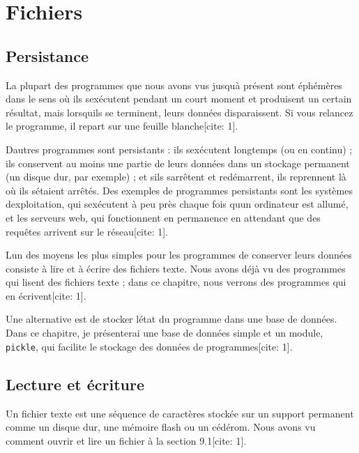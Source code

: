 \hypertarget{fichiers}{%
\section{Fichiers}\label{fichiers}}

\hypertarget{persistance}{%
\subsection{Persistance}\label{persistance}}

La plupart des programmes que nous avons vus jusqu\textquotesingle à
présent sont éphémères dans le sens où ils s\textquotesingle exécutent
pendant un court moment et produisent un certain résultat, mais
lorsqu\textquotesingle ils se terminent, leurs données disparaissent. Si
vous relancez le programme, il repart sur une feuille blanche{[}cite:
1{]}.

D\textquotesingle autres programmes sont persistants : ils
s\textquotesingle exécutent longtemps (ou en continu) ; ils conservent
au moins une partie de leurs données dans un stockage permanent (un
disque dur, par exemple) ; et s\textquotesingle ils
s\textquotesingle arrêtent et redémarrent, ils reprennent là où ils
s\textquotesingle étaient arrêtés. Des exemples de programmes
persistants sont les systèmes d\textquotesingle exploitation, qui
s\textquotesingle exécutent à peu près chaque fois qu\textquotesingle un
ordinateur est allumé, et les serveurs web, qui fonctionnent en
permanence en attendant que des requêtes arrivent sur le réseau{[}cite:
1{]}.

L\textquotesingle un des moyens les plus simples pour les programmes de
conserver leurs données consiste à lire et à écrire des fichiers texte.
Nous avons déjà vu des programmes qui lisent des fichiers texte ; dans
ce chapitre, nous verrons des programmes qui en écrivent{[}cite: 1{]}.

Une alternative est de stocker l\textquotesingle état du programme dans
une base de données. Dans ce chapitre, je présenterai une base de
données simple et un module, \texttt{pickle}, qui facilite le stockage
des données de programmes{[}cite: 1{]}.

\hypertarget{lecture-et-uxe9criture}{%
\subsection{Lecture et écriture}\label{lecture-et-uxe9criture}}

Un fichier texte est une séquence de caractères stockée sur un support
permanent comme un disque dur, une mémoire flash ou un cédérom. Nous
avons vu comment ouvrir et lire un fichier à la section 9.1{[}cite:
1{]}.

